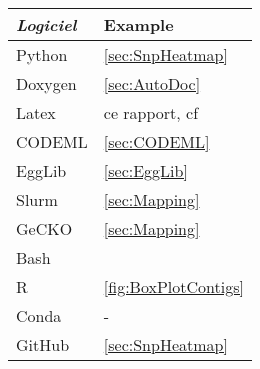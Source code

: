 \documentclass[../main]{subfiles} %
\begin{document}
\addto\extrasfrench{\protected\edef:{\unexpanded\expandafter{:}}}

\begin{table}[ht]
    \centering
    \begin{tabular}{l l}
        \toprule
        \textit{Logiciel} & Example \\
        \midrule
        \gls{Python} & \cref{sec:SnpHeatmap} \\
        \gls{Doxygen} & \cref{sec:AutoDoc} \\
        \gls{Latex} & ce rapport, cf \cite{florent_f-marchalm1bioinfointernship2024-inrae_agap_ge2pop_2024} \\
        \gls{CODEML} & \cref{sec:CODEML} \\
        \gls{EggLib} & \cref{sec:EggLib} \\
        \gls{Slurm} & \cref{sec:Mapping} \\
        \gls{GeCKO} & \cref{sec:Mapping} \\
        \gls{Bash} & \cite{florent_f-marchalm1bioinfointernship2024-inrae_agap_ge2pop_2024} \\
        \gls{R} & \cref{fig:BoxPlotContigs} \\
        \gls{Conda} & - \\
        \gls{GitHub} & \cref{sec:SnpHeatmap} \\
 


\end{tabular}
\end{table}
\end{document}
